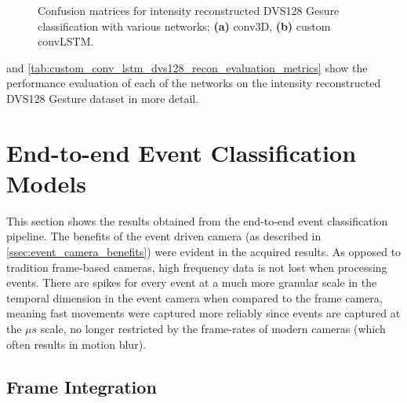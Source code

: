 \begin{figure}[htb]%
    \centering
    \qquad
    \caption{Confusion matrices for intensity reconstructed  DVS128 Gesure classification with various networks; \textbf{(a)} conv3D, \textbf{(b)} custom convLSTM.}%
    \label{fig:dvs128_recon_c_matrices}%
\end{figure}

 and \cref{tab:custom_conv_lstm_dvs128_recon_evaluation_metrics} show the performance evaluation of each of the networks on the intensity reconstructed DVS128 Gesture dataset in more detail. 

\section{End-to-end Event Classification Models}

This section shows the results obtained from the end-to-end event classification pipeline. The benefits of the event driven camera (as described in \cref{ssec:event_camera_benefits}) were evident in the acquired results. As opposed to tradition frame-based cameras, high frequency data is not lost when processing events. There are spikes for every event at a much more granular scale in the temporal dimension in the event camera when compared to the frame camera, meaning fast movements were captured more reliably since events are captured at the $\mu s$ scale, no longer restricted by the frame-rates of modern cameras (which often results in motion blur).

\subsection{Frame Integration} \label{ssec:frame_integration_testing}

